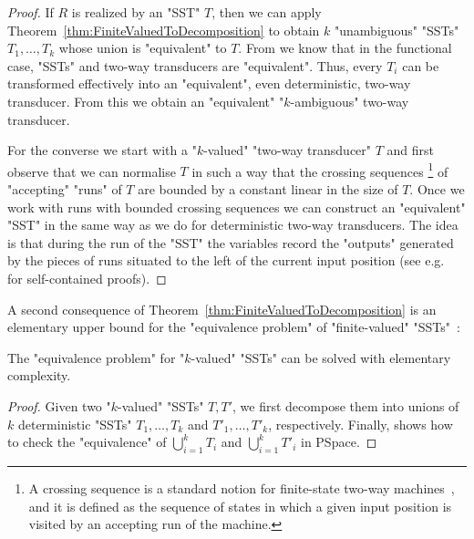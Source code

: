 \documentclass{theoretics}
\begin{document}
\begin{proof} 
 If $R$ is realized by an "SST" $T$, then we can apply
  Theorem~\ref{thm:FiniteValuedToDecomposition} to obtain $k$
  "unambiguous" "SSTs" $T_1,\dots,T_k$ whose union is "equivalent"
  to $T$.
  From \cite{DBLP:conf/fsttcs/AlurC10} we know that in the functional
  case, "SSTs" and two-way transducers are "equivalent".
  Thus, every $T_i$ can be transformed effectively into an "equivalent",
  even deterministic,  two-way transducer.
  From this we obtain an "equivalent" "$k$-ambiguous" two-way transducer.

  For the converse we start with a "$k$-valued" "two-way transducer" $T$ and
  first observe that we can normalise $T$ in such a way that the
  crossing sequences%
\footnote{A crossing sequence is a standard notion
    for finite-state two-way machines~\cite{DBLP:journals/ibmrd/Shepherdson59},
    and it is defined as the sequence of
    states in which a given input position 
    is visited by an accepting run of the machine.}
  of "accepting" "runs" of $T$ are bounded by a
  constant linear in the size of $T$.
  Once we work with runs with bounded crossing sequences we can
  construct an "equivalent" "SST" in the same way as we do for
  deterministic two-way transducers.
  The idea is that during the run of the "SST" 
  the variables record the "outputs"
  generated by the pieces of runs situated to the left 
  of the current input position 
  (see e.g.~\cite{ledent13,DBLP:journals/ijfcs/DartoisJR18} for self-contained proofs). 
\end{proof}


A second consequence of Theorem~\ref{thm:FiniteValuedToDecomposition}
is an elementary upper bound for the 
"equivalence problem" of "finite-valued"
"SSTs"~\cite{equivalence-finite-valued}:

\begin{theorem}\label{thm:equiv-finval-SST}
  The "equivalence problem" for "$k$-valued" "SSTs" can be solved with
  elementary complexity.
\end{theorem}

\begin{proof}
  Given two "$k$-valued" "SSTs" $T,T'$, we first decompose them into
  unions of $k$
  deterministic "SSTs" $T_1,\dots,T_k$ and $T'_1,\dots,T'_k$,
  respectively.
  Finally, \cite[Theorem 4.4]{DBLP:conf/icalp/AlurD11} shows how to check the
  "equivalence" of $\bigcup_{i=1}^k T_i$ and $\bigcup_{i=1}^k
      T'_i$  in {\upshape\sc PSpace}.
\end{proof}
\end{document}
